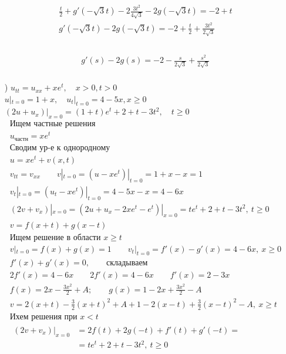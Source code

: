 \begin{enumerate}
\begin{gather*}
    \frac{t}{2}+g'(-\sqrt{3}t)-2 \frac{3t^{2}}{4 \sqrt{3}}-2g(-\sqrt{3}t)=-2+t \\
    g'(-\sqrt{3}t)-2g(-\sqrt{3}t)=-2+ \frac{t}{2}+ \frac{3t^{2}}{2 \sqrt{3}} \\
    \end{gather*} \\
    \begin{gather*}
      g'(s)-2g(s)=-2- \frac{s}{2 \sqrt{3}} + \frac{s^{2}}{2 \sqrt{3}} \\
    \end{gather*}
  \item[\text{б})] $u_{tt} = u_{xx} +xe^{t}, \quad x>0,t>0$ \\
$u|_{t=0} = 1+x, \quad u_{t}|_{t=0} = 4-5x, x \geq 0$ \\
$(2u+u_{x})|_{x=0}=(1+t)e^{t}+2+t-3t^{2}, \quad t \geq 0$ \\
\begin{gather*}
  \text{Ищем частные решения} \\
  u_{\text{частн}} = xe^{t} \\
  \text{Сводим ур-е к однородному} \\
  u = xe^{t} + v(x,t) \\
  v_{tt} = v_{xx} \qquad v|_{t=0} = (u - xe^{t})|_{t=0} = 1+x-x=1 \\
  v_{t}|_{t=0}=(u_{t}-xe^{t})|_{t=0}=4-5x-x=4-6x \\
  (2v+v_{x})|_{x=0} = (2u+u_{x}-2xe^{t}-e^{t})|_{x=0} = te^{t}+2+t-3t^{2}, \ t \geq 0 \\
v = f(x+t) + g(x-t) \\
\text{Ищем решение в области $x \geq t$} \\
v|_{t=0} = f(x)+g(x) = 1 \qquad v_{t}|_{t=0} = f'(x) - g'(x) = 4 - 6x, \ x \geq 0 \\
f'(x) + g'(x) = 0, \qquad \text{складываем} \\
2f'(x)=4-6x \qquad 2f'(x) = 4-6x \qquad f'(x) = 2-3x \\
\boxed{f(x)=2x -\frac{3x^{2}}{2}+A; \qquad g(x) = 1-2x+ \frac{3x^{2}}{2}-A} \\
v = 2(x+t) - \frac{3}{2}(x+t)^{2}+A+1-2(x-t)+ \frac{3}{2}(x-t)^{2}-A, \ x \geq t \\
\text{Ихем решения при $x < t$} \\
\begin{split}
  (2v+v_{x})|_{x=0} &= 2f(t)+2g(-t)+ f'(t) + g'(-t) = \\
                    &= te^{t} +2+t -3t^{2}, \ t \geq 0 \\

\end{split}
\end{gather*}
\end{enumerate}
